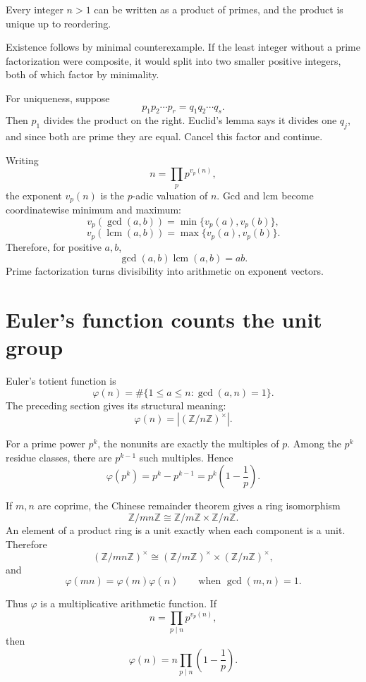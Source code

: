 \begin{theorem}
Every integer \(n>1\) can be written as a product of primes, and the product is unique up to reordering.
\end{theorem}

Existence follows by minimal counterexample.  If the least integer without a prime factorization were composite, it would split into two smaller positive integers, both of which factor by minimality.

For uniqueness, suppose
\[
  p_1p_2\cdots p_r=q_1q_2\cdots q_s.
\]
Then \(p_1\) divides the product on the right.  Euclid's lemma says it divides one \(q_j\), and since both are prime they are equal.  Cancel this factor and continue.

Writing
\[
  n=\prod_p p^{v_p(n)},
\]
the exponent \(v_p(n)\) is the \(p\)-adic valuation of \(n\).  Gcd and lcm become coordinatewise minimum and maximum:
\[
  v_p(\gcd(a,b))
  =\min\{v_p(a),v_p(b)\},
\]
\[
  v_p(\operatorname{lcm}(a,b))
  =\max\{v_p(a),v_p(b)\}.
\]
Therefore, for positive \(a,b\),
\[
  \gcd(a,b)\operatorname{lcm}(a,b)=ab.
\]
Prime factorization turns divisibility into arithmetic on exponent vectors.

\section{Euler's function counts the unit group}

Euler's totient function is
\[
  \varphi(n)
  =\#\{1\le a\le n:\gcd(a,n)=1\}.
\]
The preceding section gives its structural meaning:
\[
  \boxed{
  \varphi(n)=\left|(\mathbb Z/n\mathbb Z)^\times\right|.}
\]

For a prime power \(p^k\), the nonunits are exactly the multiples of \(p\).  Among the \(p^k\) residue classes, there are \(p^{k-1}\) such multiples.  Hence
\[
  \varphi(p^k)
  =p^k-p^{k-1}
  =p^k\left(1-\frac1p\right).
\]

If \(m,n\) are coprime, the Chinese remainder theorem gives a ring isomorphism
\[
  \mathbb Z/mn\mathbb Z
  \cong
  \mathbb Z/m\mathbb Z
  \times
  \mathbb Z/n\mathbb Z.
\]
An element of a product ring is a unit exactly when each component is a unit.  Therefore
\[
  (\mathbb Z/mn\mathbb Z)^\times
  \cong
  (\mathbb Z/m\mathbb Z)^\times
  \times
  (\mathbb Z/n\mathbb Z)^\times,
\]
and
\[
  \varphi(mn)=\varphi(m)\varphi(n)
  \qquad
  \text{when }\gcd(m,n)=1.
\]

Thus \(\varphi\) is a multiplicative arithmetic function.  If
\[
  n=\prod_{p\mid n}p^{v_p(n)},
\]
then
\[
  \boxed{
  \varphi(n)
  =n\prod_{p\mid n}
  \left(1-\frac1p\right).}
\]

